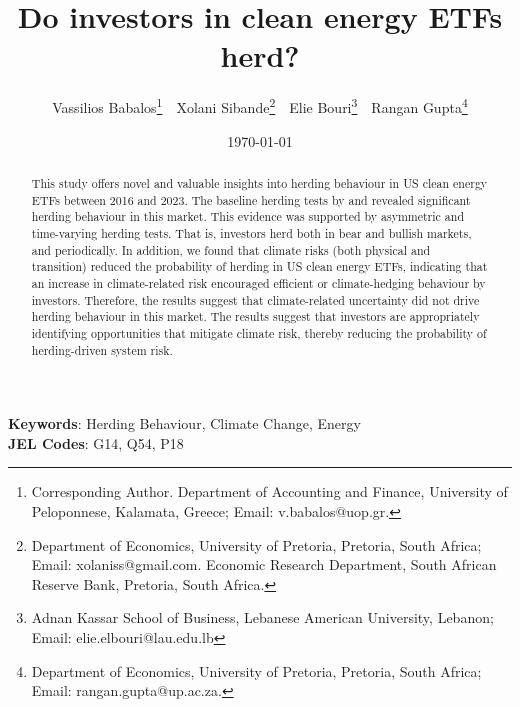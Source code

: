 \title{Do investors in clean energy ETFs herd?}



\author{ 
Vassilios Babalos\footnote{Corresponding Author. Department of Accounting and Finance, University of Peloponnese, Kalamata,  Greece; Email: v.babalos@uop.gr.} \,\,
Xolani Sibande\footnote{Department of Economics, University of Pretoria, Pretoria, South Africa; Email: xolaniss@gmail.com. Economic Research Department, South African Reserve Bank, Pretoria, South Africa.} \,\, 
Elie Bouri\footnote{Adnan Kassar School of Business, Lebanese American University, Lebanon; Email: elie.elbouri@lau.edu.lb} \,\,
Rangan Gupta\footnote{Department of Economics, University of Pretoria, Pretoria, South Africa; Email: rangan.gupta@up.ac.za.} 
}
\date{\today}
\maketitle

\begin{abstract}

This study offers novel and valuable insights into herding behaviour in US clean energy ETFs between 2016 and 2023. 
The baseline herding tests by \cite{christie1995} and \cite{chang2000} revealed significant herding behaviour in this market. 
This evidence was supported by asymmetric and time-varying herding tests. That is, investors herd both in bear and bullish markets, and periodically. 
In addition, we found that climate risks (both physical and transition) reduced the probability of herding in US clean energy ETFs, 
indicating that an increase in climate-related risk encouraged efficient or climate-hedging behaviour by investors. 
Therefore, the results suggest that climate-related uncertainty did not drive herding behaviour in this market. The results suggest that investors are appropriately identifying opportunities that mitigate climate risk,
thereby reducing the probability of herding-driven system risk.

\end{abstract}

\noindent\textbf{Keywords}: Herding Behaviour, Climate Change, Energy
\\
\textbf{JEL Codes}: G14, Q54, P18
\newpage